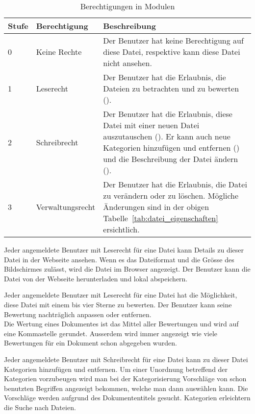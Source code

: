 \begin{table}[H]
\begin{tabularx}{\textwidth}{|l|l|X|} \hline
\textbf{Stufe} & \textbf{Berechtigung}     & \textbf{Beschreibung} \\ \hline
0     & Keine Rechte     & Der Benutzer hat keine Berechtigung auf diese Datei, respektive kann diese Datei nicht ansehen.\\ \hline
1     & Leserecht        & Der Benutzer hat die Erlaubnis, die Dateien zu betrachten und zu bewerten ({Datei bewerten}).\\ \hline
2     & Schreibrecht     & Der Benutzer hat die Erlaubnis, diese Datei mit einer neuen Datei auszutauschen ({Datei hochladen}). Er kann auch neue Kategorien hinzufügen und entfernen ({Datei kategorisieren}) und die Beschreibung der Datei ändern ({Datei bearbeiten}).\\ \hline
3     & Verwaltungsrecht & Der Benutzer hat die Erlaubnis, die Datei zu verändern oder zu löschen. Mögliche Änderungen sind in der obigen Tabelle~\ref{tab:datei_eigenschaften} ersichtlich.\\ \hline
\end{tabularx}
\caption{Berechtigungen in Modulen}
\label{tab:datei_rechte}
\end{table}

Jeder angemeldete Benutzer mit Leserecht für eine Datei kann Details zu dieser Datei in der Webseite ansehen. Wenn es das Dateiformat und die Grösse des Bildschirmes zulässt, wird die Datei im Browser angezeigt. Der Benutzer kann die Datei von der Webseite herunterladen und lokal abspeichern.

Jeder angemeldete Benutzer mit Leserecht für eine Datei hat die Möglichkeit, diese Datei mit einem bis vier Sterne zu bewerten. Der Benutzer kann seine Bewertung nachträglich anpassen oder entfernen. \\
Die Wertung eines Dokumentes ist das Mittel aller Bewertungen und wird auf eine Kommastelle gerundet. Ausserdem wird immer angezeigt wie viele Bewertungen für ein Dokument schon abgegeben wurden.

Jeder angemeldete Benutzer mit Schreibrecht für eine Datei kann zu dieser Datei Kategorien hinzufügen und entfernen. Um einer Unordnung betreffend der Kategorien vorzubeugen wird man bei der Kategorisierung Vorschläge von schon benutzten Begriffen angezeigt bekommen, welche man dann auswählen kann. Die Vorschläge werden aufgrund des Dokumententitels gesucht. Kategorien erleichtern die Suche nach Dateien. 

